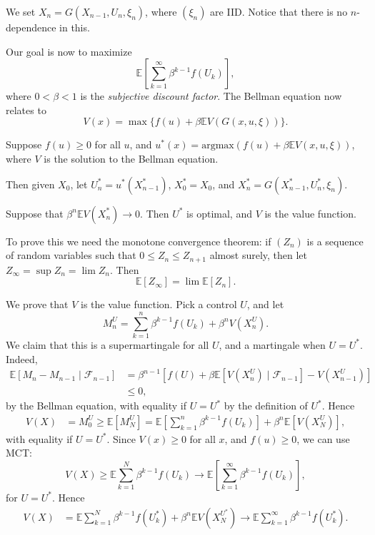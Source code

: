\documentclass[12pt]{article}
\begin{document}
We set $X_n = G(X_{n-1}, U_n, \xi_n)$, where $(\xi_n)$ are IID. Notice that there is no $n$-dependence in this.

Our goal is now to maximize
\[
\mathbb{E}\left[ \sum_{k=  1}^\infty \beta^{k-1} f(U_k) \right],
\]
where $0 < \beta < 1$ is the \emph{subjective discount factor}. The Bellman equation now relates to
\[
	V(x) = \max \{f(u) + \beta \mathbb{E} V(G(x, u, \xi)) \}.
\]

\begin{theorem}
	Suppose $f(u) \geq 0$ for all $u$, and $u^\ast (x) = \mathrm{argmax}(f(u) + \beta \mathbb{E} V(x, u, \xi))$, where $V$ is the solution to the Bellman equation.

	Then given $X_0$, let $U_n^\ast = u^\ast(X_{n-1}^\ast)$, $X_0^\ast = X_0$, and $X_n^\ast = G(X_{n-1}^\ast, U_n^\ast, \xi_n)$.

	Suppose that $\beta^n \mathbb{E} V(X_n^\ast) \to 0$. Then $U^\ast$ is optimal, and $V$ is the value function.
\end{theorem}

To prove this we need the monotone convergence theorem: if $(Z_n)$ is a sequence of random variables such that $0 \leq Z_n \leq Z_{n+1}$ almost surely, then let $Z_\infty = \sup Z_n = \lim Z_n$. Then
\[
\mathbb{E}[Z_\infty] = \lim \mathbb{E}[Z_n].
\]

\begin{proofbox}
	We prove that $V$ is the value function. Pick a control $U$, and let
	\[
	M_n^U = \sum_{k = 1}^n \beta^{k-1} f(U_k) + \beta^n V(X_n^U).
	\]
	We claim that this is a supermartingale for all $U$, and a martingale when $U = U^\ast$. Indeed,
	\begin{align*}
		\mathbb{E}[M_n - M_{n-1} \mid \mathcal{F}_{n-1}] &= \beta^{n-1} [f(U) + \beta \mathbb{E}[V(X_n^U) \mid \mathcal{F}_{n-1}] - V(X_{n-1}^U)] \\
								 &\leq 0,
	\end{align*}
	by the Bellman equation, with equality if $U = U^\ast$ by the definition of $U^\ast$. Hence
	\begin{align*}
		V(X) &= M_0^U \geq \mathbb{E}[M_N^U] = \mathbb{E}\left[ \sum_{k=1}^n \beta^{k-1} f(U_k)\right] + \beta^{n} \mathbb{E}[V(X_N^U)],
	\end{align*}
	with equality if $U = U^\ast$. Since $V(x) \geq 0$ for all $x$, and $f(u) \geq 0$, we can use MCT:
	\[
	V(X) \geq \mathbb{E} \sum_{k = 1}^N \beta^{k-1} f(U_k) \to \mathbb{E}\left[ \sum_{k = 1}^\infty \beta^{k-1} f(U_k) \right],
	\]
	for $U = U^\ast$. Hence
	\begin{align*}
		V(X) &= \mathbb{E} \sum_{k = 1}^N \beta^{k-1} f(U_k^\ast) + \beta^{n} \mathbb{E} V(X_N^{U^\ast}) \to \mathbb{E} \sum_{k = 1}^\infty \beta^{k-1} f(U_k^\ast).
	\end{align*}
\end{proofbox}
\end{document}
